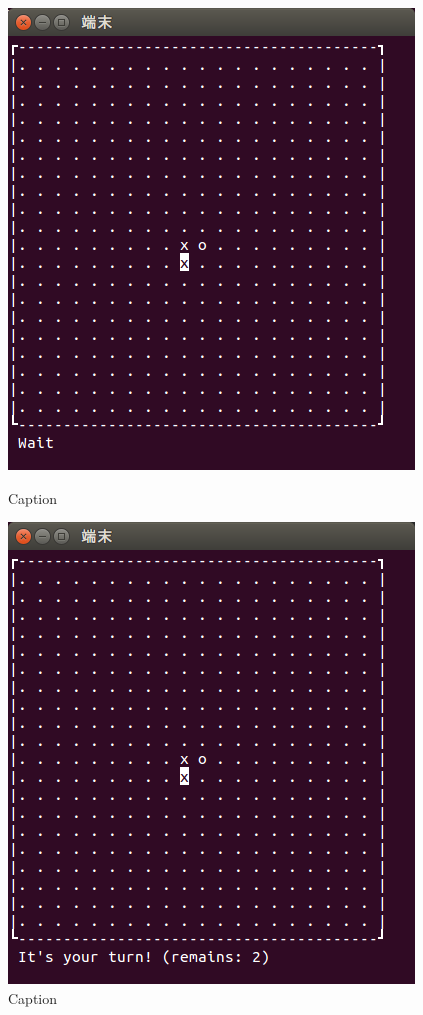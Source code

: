 \documentclass[a4j, titlepage, 10pt]{jsarticle}
\begin{document}
\begin{figure}[H]
  \begin{minipage}{0.5\hsize}
    \centering
    \includegraphics[scale=0.5]{img/put3-1.png}
    \caption{Caption}
    \label{fig:put3-1.png}
  \end{minipage}
  \begin{minipage}{0.5\hsize}
    \includegraphics[scale=0.5]{img/put3-2.png}
    \caption{Caption}
    \label{fig:put3-2.png}
  \end{minipage}
\end{figure}
\end{document}
